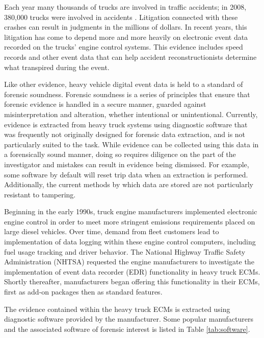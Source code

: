 Each year many thousands of trucks are involved in traffic accidents; in 2008, 380,000 trucks were involved in accidents \cite{NHTSA2008}.
Litigation connected with these crashes can result in judgments in the millions of dollars. In recent years, this litigation has 
come to depend more and more heavily on electronic event data recorded on the trucks' engine control systems. 
This evidence includes speed records and other event data that can help accident reconstructionists 
determine what transpired during the event.

Like other evidence, heavy vehicle digital event data is held to a standard of forensic soundness. Forensic soundness is a series of principles 
that ensure that forensic evidence is handled in a secure manner, guarded against misinterpretation and alteration, whether intentional
or unintentional.
Currently, evidence is extracted from heavy truck systems using diagnostic software that was frequently not originally designed for forensic data extraction, 
and is not particularly suited to the task. While evidence can be collected using this data in a forensically sound 
manner, doing so requires diligence on the part of the investigator and mistakes can result in evidence being dismissed. For example, some software by default will
reset trip data when an extraction is performed.
Additionally, the current methods by which data are stored are not particularly resistant to tampering\cite{Johnson2014}. 


Beginning in the early 1990s, truck engine manufacturers implemented electronic engine control in order to meet more stringent emissions
requirements placed on large diesel vehicles\cite{NHTSA-EDR-2002}. Over time, demand from fleet customers lead to implementation of data logging within these
engine control computers, including fuel usage tracking and driver behavior. The National Highway Traffic Safety Administration (NHTSA) 
requested the engine manufacturers to investigate the implementation
of event data recorder (EDR) functionality in heavy truck ECMs. Shortly thereafter, manufacturers began offering this functionality in their
ECMs, first as add-on packages then as standard features.

The evidence contained within the heavy truck ECMs is extracted using diagnostic software provided by the manufacturer. Some popular
manufacturers and the associated software of forensic interest is listed in Table \ref{tab:software}.

